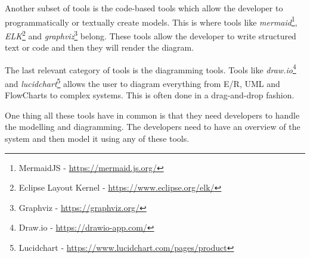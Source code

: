 Another subset of tools is the code-based tools which allow the developer to programmatically or textually create models. This is where tools like \textit{mermaid}\footnote{MermaidJS - \url{https://mermaid.js.org/}}, \textit{ELK}\footnote{Eclipse Layout Kernel - \url{https://www.eclipse.org/elk/}} and \textit{graphviz}\footnote{Graphviz - \url{https://graphviz.org/}} belong.
These tools allow the developer to write structured text or code and then they will render the diagram.

The last relevant category of tools is the diagramming tools. Tools like \textit{draw.io}\footnote{Draw.io - \url{https://drawio-app.com/}} and \textit{lucidchart}\footnote{Lucidchart - \url{https://www.lucidchart.com/pages/product}} allows the user to diagram everything from E/R, UML and FlowCharts to complex systems.
This is often done in a drag-and-drop fashion.

One thing all these tools have in common is that they need developers to handle the modelling and diagramming. The developers need to have an overview of the system and then model it using any of these tools.
\clearpage